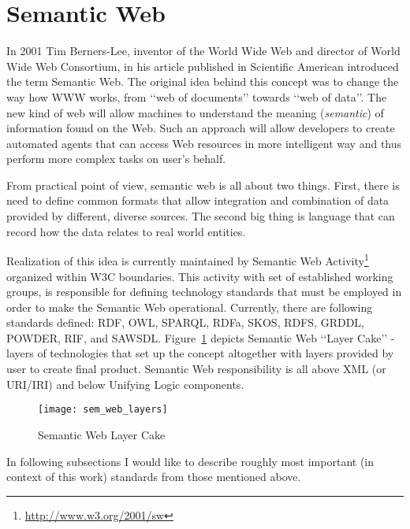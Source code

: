 %
\section{Semantic Web}

\label{sec:ch2_semantic_web}
In 2001 Tim Berners-Lee, inventor of the World Wide Web and director of World Wide Web Consortium, in his article published in Scientific American\cite{berneslee:semanticWeb} introduced the term Semantic Web. The original idea behind this concept was to change the way how WWW works, from \lq\lq{}web of documents\rq\rq{} towards \lq\lq{}web of data\rq\rq{}. The new kind of web will allow machines to understand the meaning (\emph{semantic}) of information found on the Web. Such an approach will allow developers to create automated agents that can access Web resources in more intelligent way and thus perform more complex tasks on user\rq{}s behalf.

From practical point of view, semantic web is all about two things. First, there is need to define common formats that allow integration and combination of data provided by different, diverse sources. The second big thing is language that can record how the data relates to real world entities. 

Realization of this idea is currently maintained by Semantic Web Activity\footnote{\url{http://www.w3.org/2001/sw}} organized within W3C boundaries. This activity with set of established working groups, is responsible for defining technology standards that must be employed in order to make the Semantic Web operational. Currently, there are following standards defined: RDF, OWL, SPARQL, RDFa, SKOS, RDFS, GRDDL, POWDER, RIF, and SAWSDL. Figure~\ref{fig:sem_web_layers} depicts Semantic Web \lq\lq{}Layer Cake\rq\rq{} - layers of technologies that set up the concept altogether with layers provided by user to create final product. Semantic Web responsibility is all above XML (or URI/IRI) and below Unifying Logic components.

\begin{figure}[ht]
	\centering
	\texttt{[image: sem\_web\_layers]}
	\caption{Semantic Web Layer Cake}
	\label{fig:sem_web_layers}
\end{figure}

In following subsections I would like to describe roughly most important (in context of this work) standards from those mentioned above.

